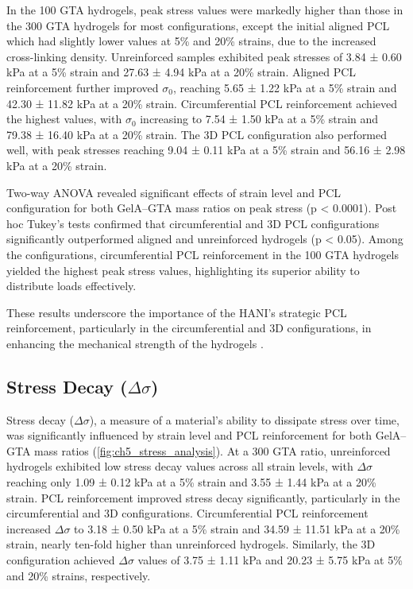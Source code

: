 In the 100 GTA hydrogels, peak stress values were markedly higher than those in the 300 GTA hydrogels for most configurations, except the initial aligned PCL which had slightly lower values at 5\% and 20\% strains, due to the increased cross-linking density. Unreinforced samples exhibited peak stresses of 3.84 ± 0.60 kPa at a 5\% strain and 27.63 ± 4.94 kPa at a 20\% strain. Aligned PCL reinforcement further improved $\sigma_0$, reaching 5.65 ± 1.22 kPa at a 5\% strain and 42.30 ± 11.82 kPa at a 20\% strain. Circumferential PCL reinforcement achieved the highest values, with $\sigma_0$ increasing to 7.54 ± 1.50 kPa at a 5\% strain and 79.38 ± 16.40 kPa at a 20\% strain. The 3D PCL configuration also performed well, with peak stresses reaching 9.04 ± 0.11 kPa at a 5\% strain and 56.16 ± 2.98 kPa at a 20\% strain.

Two-way ANOVA revealed significant effects of strain level and PCL configuration for both GelA--GTA mass ratios on peak stress (p < 0.0001). Post hoc Tukey's tests confirmed that circumferential and 3D PCL configurations significantly outperformed aligned and unreinforced hydrogels (p < 0.05). Among the configurations, circumferential PCL reinforcement in the 100 GTA hydrogels yielded the highest peak stress values, highlighting its superior ability to distribute loads effectively.

These results underscore the importance of the HANI's strategic PCL reinforcement, particularly in the circumferential and 3D configurations, in enhancing the mechanical strength of the hydrogels \cite{boschetti2004biomechanicalproperties,patel2019systematicreview}.

\subsection{Stress Decay ($\Delta\sigma$)}

Stress decay ($\Delta\sigma$), a measure of a material's ability to dissipate stress over time, was significantly influenced by strain level and PCL reinforcement for both GelA--GTA mass ratios (\autoref{fig:ch5_stress_analysis}). At a 300 GTA ratio, unreinforced hydrogels exhibited low stress decay values across all strain levels, with $\Delta\sigma$ reaching only 1.09 ± 0.12 kPa at a 5\% strain and 3.55 ± 1.44 kPa at a 20\% strain. PCL reinforcement improved stress decay significantly, particularly in the circumferential and 3D configurations. Circumferential PCL reinforcement increased $\Delta\sigma$ to 3.18 ± 0.50 kPa at a 5\% strain and 34.59 ± 11.51 kPa at a 20\% strain, nearly ten-fold higher than unreinforced hydrogels. Similarly, the 3D configuration achieved $\Delta\sigma$ values of 3.75 ± 1.11 kPa and 20.23 ± 5.75 kPa at 5\% and 20\% strains, respectively.

